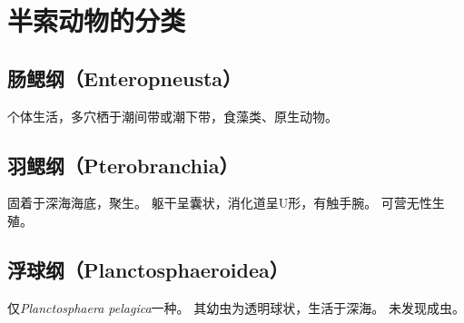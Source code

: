 \documentclass[11pt]{article}
\begin{document}
\section{半索动物的分类}
\subsection{肠鳃纲（Enteropneusta）}
个体生活，多穴栖于潮间带或潮下带，食藻类、原生动物。

\subsection{羽鳃纲（Pterobranchia）}
固着于深海海底，聚生。
躯干呈囊状，消化道呈U形，有触手腕。
可营无性生殖。

\subsection{浮球纲（Planctosphaeroidea）}
仅\textit{Planctosphaera pelagica}一种。
其幼虫为透明球状，生活于深海。
未发现成虫。
\end{document}
